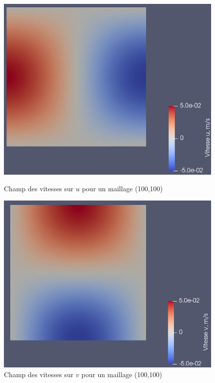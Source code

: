\documentclass[a4paper,oneside]{article}
\begin{document}
\begin{figure}[h]
    \begin{minipage}[c]{.46\linewidth}
        \centering
        \includegraphics[scale=0.3]{Champ_Vitesse_Maillage/Champ_Vitesse_u.png}
        \caption{Champ des vitesses sur $u$ pour un maillage (100,100)}
    \end{minipage}
    \hfill%
    \begin{minipage}[c]{.46\linewidth}
        \centering
        \includegraphics[scale=0.3]{Champ_Vitesse_Maillage/Champ_Vitesse_v.png}
        \caption{Champ des vitesses sur $v$ pour un maillage (100,100)}
    \end{minipage}
\end{figure}
\end{document}
